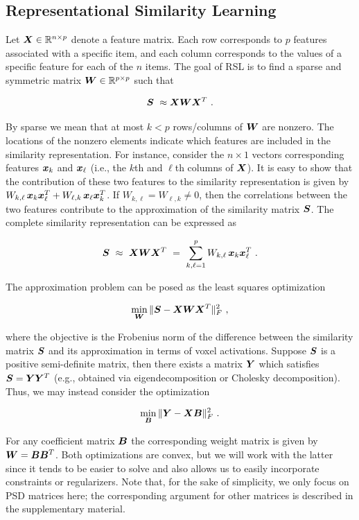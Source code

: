 \subsection{Representational Similarity Learning}

Let $\boldsymbol{X} \in {\mathbb R}^{n\times p}$ denote a feature matrix.
Each row corresponds to $p$ features associated with a specific item, and each column
corresponds to the values of a specific feature for each of the $n$ items. The goal of RSL
is to find a sparse and symmetric matrix  $\boldsymbol{W}\in {\mathbb R}^{p\times p}$ such that

$$\bS \ \approx \bX \bW \bX^T \ .$$

By sparse we mean that at most $k<p$ rows/columns of $\boldsymbol{W}$ are nonzero. The locations of
the nonzero elements indicate which features are included in the similarity
representation.  For instance, consider the $n\times 1$ vectors corresponding features
$\boldsymbol{x}_k$ and $\boldsymbol{x}_{\ell}$ (i.e., the $k$th and $\ell$th columns of $\boldsymbol{X}$).  It is easy to
show that the contribution of these two features to the similarity representation is given
by $ W_{k,\ell} \, \boldsymbol{x}_k \boldsymbol{x}_{\ell}^T + W_{\ell,k} \, \boldsymbol{x}_\ell \boldsymbol{x}_{k}^T$.  If
$W_{k,\ell}=W_{\ell,k}\neq 0$, then the correlations between the two features contribute
to the approximation of the similarity matrix $\boldsymbol{S}$. The complete similarity
representation can be expressed as

$$\bS \ \approx \ \bX\bW\bX^T \ = \ \sum_{k,\ell=1}^p W_{k,\ell} \, \bx_k \bx_{\ell}^T \ .$$

The approximation problem can be posed as the least squares optimization

$$\min_{\bW} \|\bS-\bX\bW\bX^T\|_F^2 \ , $$

where the objective is the Frobenius norm of the difference between the similarity matrix
$\boldsymbol{S}$ and its approximation in terms of voxel activations. Suppose $\boldsymbol{S}$ is a positive
semi-definite matrix, then there exists a matrix $\boldsymbol{Y}$ which satisfies $\boldsymbol{S}=\boldsymbol{Y}\boldsymbol{Y}^T$
(e.g., obtained via eigendecomposition or Cholesky decomposition).  Thus, we may instead
consider the optimization

$$\min_{\bB} \|\bY-\bX\bB\|_F^2 \ . $$

For any coefficient matrix $\boldsymbol{B}$ the corresponding weight matrix is given by $\boldsymbol{W} =
\boldsymbol{B}\boldsymbol{B}^T$. Both optimizations are convex, but we will work with the latter since it tends
to be easier to solve and also allows us to easily incorporate constraints or
regularizers. Note that, for the sake of simplicity, we only focus on PSD matrices here;
the corresponding argument for other matrices is described in the supplementary material.

